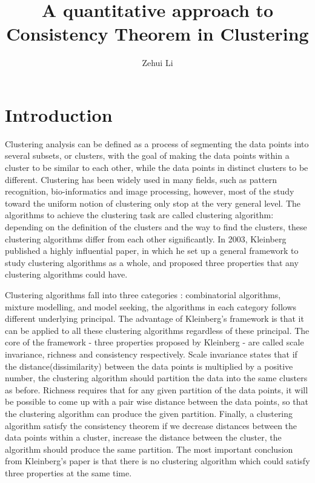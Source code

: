 \documentclass{uonmathreport}
\title{A quantitative approach to Consistency Theorem in Clustering}
\author{Zehui Li}
\begin{document}
\maketitle

\begin{abstract}

\end{abstract}

\setcounter{tocdepth}{2}  %
\tableofcontents 
\newpage

\section{Introduction} \label{sec:intro}
Clustering analysis can be defined as a process of segmenting the data points into several subsets, or clusters, with the goal of making the data points within a cluster to be similar to each other, while the data points in distinct clusters to be different. Clustering has been widely used in many fields, such as pattern recognition, bio-informatics and image processing, however, most of the study toward the uniform notion of clustering only stop at the very general level. The algorithms to achieve the clustering task are called clustering algorithm: depending on the definition of the clusters and the way to find the clusters, these clustering algorithms differ from each other significantly. In 2003, Kleinberg \cite{Kleinberg} published a highly influential paper, in which he set up a general framework to study clustering algorithms as a whole, and proposed three properties that any clustering algorithms could have.
\newline

\noindent
Clustering algorithms fall into three categories \cite{esl}: combinatorial algorithms, mixture modelling, and model seeking, the algorithms in each category follows different underlying principal. The advantage of Kleinberg's framework is that it can be applied to all these clustering algorithms regardless of these principal. The core of the framework - three properties proposed by Kleinberg - are called scale invariance, richness and consistency respectively. Scale invariance states that if the distance(dissimilarity) between the data points is multiplied by a positive number, the clustering algorithm should partition the data into the same clusters as before. Richness requires that for any given partition of the data points, it will be possible to come up with a pair wise distance between the data points, so that the clustering algorithm can produce the given partition. Finally, a clustering algorithm satisfy the consistency theorem if we decrease distances between the data points within a cluster, increase the distance between the cluster, the algorithm should produce the same partition. The most important conclusion from Kleinberg's paper is that there is no clustering algorithm which could satisfy three properties at the same time.
\end{document}
